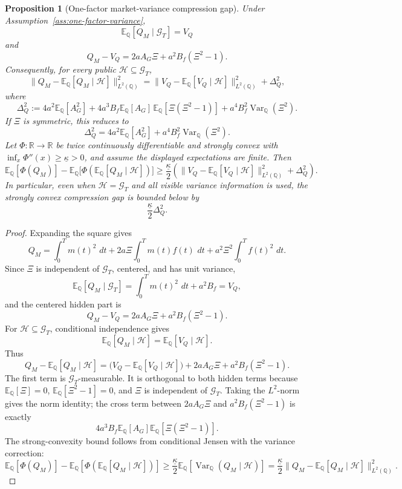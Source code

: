\documentclass[11pt,a4paper]{amsart}
\theoremstyle{plain}
\newtheorem{proposition}[theorem]{Proposition}
\theoremstyle{definition}
\theoremstyle{remark}
\DeclareMathOperator{\Var}{Var}
\newcommand{\R}{\mathbb{R}}
\newcommand{\QQ}{\mathbb{Q}}
\newcommand{\EE}{\mathbb{E}}
\newcommand{\cG}{\mathcal{G}}
\newcommand{\cH}{\mathcal{H}}
\newcommand{\dd}{\,d}
\begin{document}
\begin{proposition}[One-factor market-variance compression gap]\label{thm:concrete-variance-compression}
Under Assumption~\ref{ass:one-factor-variance},
\[
        \EE_\QQ[Q_M\mid\cG_T]=V_Q
\]
and
\[
        Q_M-V_Q
        =
        2aA_G\Xi+a^2B_f(\Xi^2-1).
\]
Consequently, for every public \(\cH\subseteq\cG_T\),
\[
        \|Q_M-\EE_\QQ[Q_M\mid\cH]\|_{L^2(\QQ)}^2
        =
        \|V_Q-\EE_\QQ[V_Q\mid\cH]\|_{L^2(\QQ)}^2
        +
        \Delta_Q^2,
\]
where
\[
        \Delta_Q^2
        :=
        4a^2\EE_\QQ[A_G^2]
        +
        4a^3B_f\EE_\QQ[A_G]\,\EE_\QQ[\Xi(\Xi^2-1)]
        +
        a^4B_f^2\Var_\QQ(\Xi^2).
\]
If \(\Xi\) is symmetric, this reduces to
\[
        \Delta_Q^2
        =
        4a^2\EE_\QQ[A_G^2]+a^4B_f^2\Var_\QQ(\Xi^2).
\]
Let \(\Phi:\R\to\R\) be twice continuously differentiable and strongly convex with
\(\inf_x\Phi''(x)\ge\underline\kappa>0\), and assume the displayed expectations are finite.  Then
\[
        \EE_\QQ[\Phi(Q_M)]-
        \EE_\QQ\!\bigl[\Phi(\EE_\QQ[Q_M\mid\cH])\bigr]
        \ge
        \frac{\underline\kappa}{2}
        \left(
                \|V_Q-\EE_\QQ[V_Q\mid\cH]\|_{L^2(\QQ)}^2+
                \Delta_Q^2
        \right).
\]
In particular, even when \(\cH=\cG_T\) and all visible variance information is used, the strongly
convex compression gap is bounded below by
\[
        \frac{\underline\kappa}{2}\Delta_Q^2.
\]
\end{proposition}

\begin{proof}
Expanding the square gives
\[
        Q_M
        =
        \int_0^Tm(t)^2\,\dd t
        +2a\Xi\int_0^Tm(t)f(t)\,\dd t
        +a^2\Xi^2\int_0^Tf(t)^2\,\dd t.
\]
Since \(\Xi\) is independent of \(\cG_T\), centered, and has unit variance,
\[
        \EE_\QQ[Q_M\mid\cG_T]=\int_0^Tm(t)^2\,\dd t+a^2B_f=V_Q,
\]
and the centered hidden part is
\[
        Q_M-V_Q=2aA_G\Xi+a^2B_f(\Xi^2-1).
\]
For \(\cH\subseteq\cG_T\), conditional independence gives
\[
        \EE_\QQ[Q_M\mid\cH]=\EE_\QQ[V_Q\mid\cH].
\]
Thus
\[
        Q_M-\EE_\QQ[Q_M\mid\cH]
        =
        \bigl(V_Q-\EE_\QQ[V_Q\mid\cH]\bigr)
        +2aA_G\Xi+a^2B_f(\Xi^2-1).
\]
The first term is \(\cG_T\)-measurable.  It is orthogonal to both hidden terms because
\(\EE_\QQ[\Xi]=0\), \(\EE_\QQ[\Xi^2-1]=0\), and \(\Xi\) is independent of \(\cG_T\).  Taking the
\(L^2\)-norm gives the norm identity; the cross term between \(2aA_G\Xi\) and
\(a^2B_f(\Xi^2-1)\) is exactly
\[
        4a^3B_f\EE_\QQ[A_G]\EE_\QQ[\Xi(\Xi^2-1)].
\]
The strong-convexity bound follows from conditional Jensen with the variance correction:
\[
        \EE_\QQ[\Phi(Q_M)]-
        \EE_\QQ[\Phi(\EE_\QQ[Q_M\mid\cH])]
        \ge
        \frac{\underline\kappa}{2}
        \EE_\QQ[\Var_\QQ(Q_M\mid\cH)]
        =
        \frac{\underline\kappa}{2}
        \|Q_M-\EE_\QQ[Q_M\mid\cH]\|_{L^2(\QQ)}^2.
\]
\end{proof}
\end{document}
